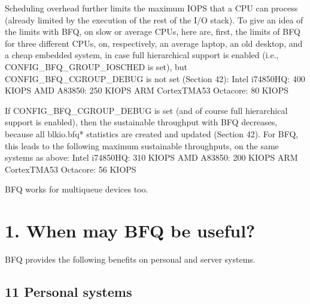 \documentclass[a4paper,11pt,english]{sphinxmanual}
\begin{document}
Scheduling overhead further limits the maximum IOPS that a CPU can
process (already limited by the execution of the rest of the I/O
stack). To give an idea of the limits with BFQ, on slow or average
CPUs, here are, first, the limits of BFQ for three different CPUs, on,
respectively, an average laptop, an old desktop, and a cheap embedded
system, in case full hierarchical support is enabled (i.e.,
CONFIG\_BFQ\_GROUP\_IOSCHED is set), but CONFIG\_BFQ\_CGROUP\_DEBUG is not
set (Section 4\sphinxhyphen{}2):
\sphinxhyphen{} Intel i7\sphinxhyphen{}4850HQ: 400 KIOPS
\sphinxhyphen{} AMD A8\sphinxhyphen{}3850: 250 KIOPS
\sphinxhyphen{} ARM CortexTM\sphinxhyphen{}A53 Octa\sphinxhyphen{}core: 80 KIOPS

If CONFIG\_BFQ\_CGROUP\_DEBUG is set (and of course full hierarchical
support is enabled), then the sustainable throughput with BFQ
decreases, because all blkio.bfq* statistics are created and updated
(Section 4\sphinxhyphen{}2). For BFQ, this leads to the following maximum
sustainable throughputs, on the same systems as above:
\sphinxhyphen{} Intel i7\sphinxhyphen{}4850HQ: 310 KIOPS
\sphinxhyphen{} AMD A8\sphinxhyphen{}3850: 200 KIOPS
\sphinxhyphen{} ARM CortexTM\sphinxhyphen{}A53 Octa\sphinxhyphen{}core: 56 KIOPS

BFQ works for multi\sphinxhyphen{}queue devices too.


\section{1. When may BFQ be useful?}
\label{\detokenize{bfq-iosched:when-may-bfq-be-useful}}
BFQ provides the following benefits on personal and server systems.


\subsection{1\sphinxhyphen{}1 Personal systems}
\label{\detokenize{bfq-iosched:personal-systems}}
\end{document}
